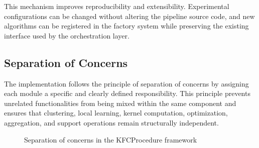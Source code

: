 This mechanism improves reproducibility and extensibility. Experimental configurations can be changed without altering the pipeline source code, and new algorithms can be registered in the factory system while preserving the existing interface used by the orchestration layer.


\subsection{Separation of Concerns}

\hs The implementation follows the principle of separation of concerns by assigning each module a specific and clearly defined responsibility. This principle prevents unrelated functionalities from being mixed within the same component and ensures that clustering, local learning, kernel computation, optimization, aggregation, and support operations remain structurally independent.

\begin{figure}[H]
      \centering
      \caption{Separation of concerns in the KFCProcedure framework}
      \label{fig:separation_of_concerns}
\end{figure}

